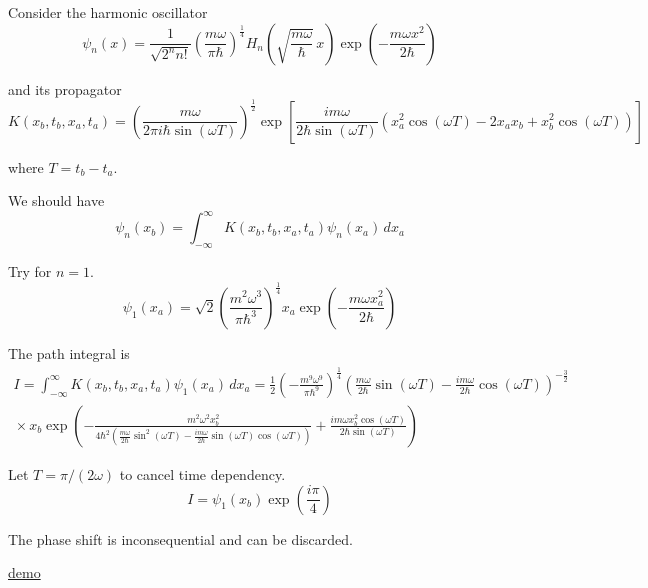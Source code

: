

Consider the harmonic oscillator
\begin{equation*}
\psi_n(x)=\frac{1}{\sqrt{2^nn!}}\left(\frac{m\omega}{\pi\hbar}\right)^\frac{1}{4}
H_n\left(\sqrt{\frac{m\omega}{\hbar}}\,x\right)
\exp\left(-\frac{m\omega x^2}{2\hbar}\right)
\end{equation*}

and its propagator
\begin{equation*}
K(x_b,t_b,x_a,t_a)
=\left(\frac{m\omega}{2\pi i\hbar\sin(\omega T)}\right)^\frac{1}{2}
\exp\left[
\frac{im\omega}{2\hbar\sin(\omega T)}
\left(x_a^2\cos(\omega T)-2x_ax_b+x_b^2\cos(\omega T)\right)
\right]
\end{equation*}

where $T=t_b-t_a$.

\bigskip
We should have
\begin{equation*}
\psi_n(x_b)=\int_{-\infty}^\infty K(x_b,t_b,x_a,t_a)\psi_n(x_a)\,dx_a
\end{equation*}

Try for $n=1$.
\begin{equation*}
\psi_1(x_a)=\sqrt2\left(\frac{m^2\omega^3}{\pi\hbar^3}\right)^\frac{1}{4}
x_a\exp\left(-\frac{m\omega x_a^2}{2\hbar}\right)
\end{equation*}

The path integral is
\begin{multline*}
I=\int_{-\infty}^\infty K(x_b,t_b,x_a,t_a)\psi_1(x_a)\,dx_a
=\frac{1}{2}\left(-\frac{m^9\omega^9}{\pi\hbar^9}\right)^\frac{1}{4}
\left(\frac{m\omega}{2\hbar}\sin(\omega T)
-\frac{im\omega}{2\hbar}\cos(\omega T)\right)^{-\frac{3}{2}}
\\{}\times
x_b\exp\left(
-\frac{m^2\omega^2x_b^2}
{4\hbar^2\left(\frac{m\omega}{2\hbar}\sin^2(\omega T)
-\frac{im\omega}{2\hbar}\sin(\omega T)\cos(\omega T)\right)}
+\frac{im\omega x_b^2\cos(\omega T)}{2\hbar\sin(\omega T)}
\right)
\end{multline*}

Let $T=\pi/(2\omega)$ to cancel time dependency.
\begin{equation*}
I=\psi_1(x_b)\exp\left(\frac{i\pi}{4}\right)
\end{equation*}

The phase shift is inconsequential and can be discarded.

\bigskip
\href{https://georgeweigt.github.io/blog/10.html}{demo}

